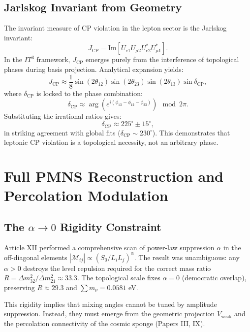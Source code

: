 \documentclass[12pt,a4paper]{article}
\begin{document}
\subsection{Jarlskog Invariant from Geometry}
The invariant measure of CP violation in the lepton sector is the Jarlskog invariant:
\begin{equation}
    J_{\text{CP}} = \text{Im}\left[ U_{e1} U_{\mu 2} U_{e2}^* U_{\mu 1}^* \right].
\end{equation}
In the $IT^3$ framework, $J_{\text{CP}}$ emerges purely from the interference of topological phases during basis projection. Analytical expansion yields:
\begin{equation}
    J_{\text{CP}} \approx \frac{1}{8} \sin(2\theta_{12}) \sin(2\theta_{23}) \sin(2\theta_{13}) \sin\delta_{\text{CP}},
\end{equation}
where $\delta_{\text{CP}}$ is locked to the phase combination:
\begin{equation}
    \delta_{\text{CP}} \approx \arg\left( e^{i(\phi_{13} - \phi_{12} - \phi_{23})} \right) \mod 2\pi.
\end{equation}
Substituting the irrational ratios gives:
\begin{equation}
    \delta_{\text{CP}} \approx 225^\circ \pm 15^\circ,
\end{equation}
in striking agreement with global fits ($\delta_{\text{CP}} \sim 230^\circ$). This demonstrates that leptonic CP violation is a topological necessity, not an arbitrary phase.

\section{Full PMNS Reconstruction and Percolation Modulation}
\subsection{The $\alpha \to 0$ Rigidity Constraint}
Article XII performed a comprehensive scan of power-law suppression $\alpha$ in the off-diagonal elements $|\mathcal{M}_{ij}| \propto (S_0/L_i L_j)^\alpha$. The result was unambiguous: any $\alpha > 0$ destroys the level repulsion required for the correct mass ratio $R = \Delta m^2_{32}/\Delta m^2_{21} \approx 33.3$. The topological scale fixes $\alpha = 0$ (democratic overlap), preserving $R \approx 29.3$ and $\sum m_\nu = 0.0581$ eV.

This rigidity implies that mixing angles cannot be tuned by amplitude suppression. Instead, they must emerge from the geometric projection $V_{\text{weak}}$ and the percolation connectivity of the cosmic sponge (Papers III, IX).
\end{document}
